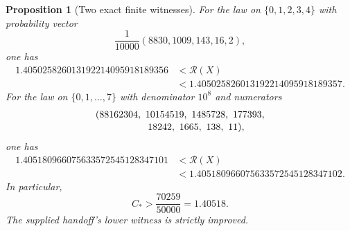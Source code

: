 \documentclass[11pt]{article}
\newtheorem{proposition}[theorem]{Proposition}
\theoremstyle{remark}
\begin{document}
\begin{proposition}[Two exact finite witnesses]\label{prop:entropy}
For the law on $\{0,1,2,3,4\}$ with probability vector
\[
 \frac1{10000}(8830,1009,143,16,2),
\]
one has
\begin{align*}
 1.405025826013192214095918189356
 &<\mathcal R(X)\\
 &<1.405025826013192214095918189357.
\end{align*}
For the law on $\{0,1,\ldots,7\}$ with denominator $10^8$ and numerators
\begin{align*}
 &(88162304,\ 10154519,\ 1485728,\ 177393,\\[-2pt]
 &\hspace{19mm}18242,\ 1665,\ 138,\ 11),
\end{align*}
one has
\begin{align*}
 1.405180966075633572545128347101
 &<\mathcal R(X)\\
 &<1.405180966075633572545128347102.
\end{align*}
In particular,
\begin{equation}\label{eq:Cbound}
 \boxed{\quad C_*>\frac{70259}{50000}=1.40518.\quad}
\end{equation}
The supplied handoff's lower witness is strictly improved.
\end{proposition}
\end{document}
